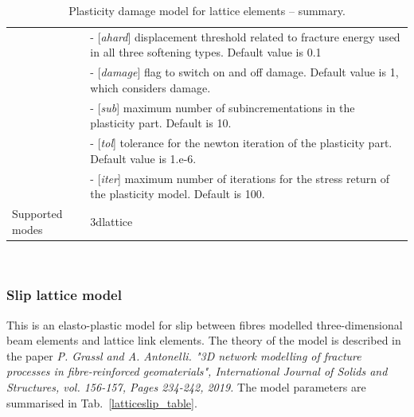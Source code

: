 \documentclass[a4paper]{article}
\newcommand{\optparam}[1]{[{\it #1}]}
\newenvironment{mmt}{\begin{tabular}{|l|p{9cm}|}}{\end{tabular}\\}
\newenvironment{mmt}{\begin{tabular}{|l|l|}}{\end{tabular}\\}
\begin{document}
\begin{table}[!htb]
\begin{mmt}
&- \optparam{ahard} displacement threshold related to fracture energy used in all three softening types. Default value is 0.1\\
&- \optparam{damage} flag to switch on and off damage. Default value is 1, which considers damage.\\
&- \optparam{sub} maximum number of subincrementations in the plasticity part. Default is 10.\\
&- \optparam{tol} tolerance for the newton iteration of the plasticity part.  Default value is 1.e-6.\\
&- \optparam{iter} maximum number of iterations for the stress return of the plasticity model. Default is 100.\\

Supported modes& 3dlattice\\
\hline
\end{mmt}
\caption{Plasticity damage model for lattice elements -- summary.}
\label{latticeplastdam_table}
\end{table}


\subsubsection{Slip lattice model}
This is an elasto-plastic model for slip between fibres modelled three-dimensional beam elements and lattice link elements. The theory of the model is described in the paper \textit{P. Grassl and A. Antonelli. "3D network modelling of fracture processes in fibre-reinforced geomaterials", International Journal of Solids and Structures, vol. 156-157, Pages 234-242, 2019.} The model parameters are summarised in Tab.~\ref{latticeslip_table}.
\end{document}
